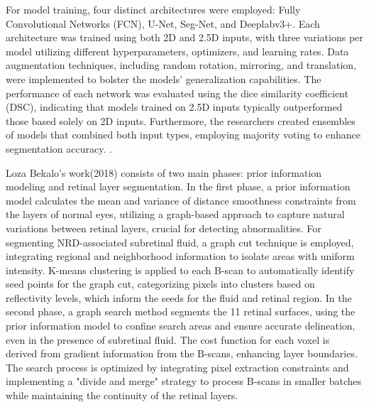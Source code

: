 \documentclass{article}
\begin{document}
For model training, four distinct architectures were employed: Fully Convolutional Networks (FCN), U-Net, Seg-Net, and Deeplabv3+. Each architecture was trained using both 2D and 2.5D inputs, with three variations per model utilizing different hyperparameters, optimizers, and learning rates. Data augmentation techniques, including random rotation, mirroring, and translation, were implemented to bolster the models' generalization capabilities. The performance of each network was evaluated using the dice similarity coefficient (DSC), indicating that models trained on 2.5D inputs typically outperformed those based solely on 2D inputs. Furthermore, the researchers created ensembles of models that combined both input types, employing majority voting to enhance segmentation accuracy. \cite{alsaih2021retinal}.


 Loza Bekalo's work(2018) consists of two main phases: prior information modeling and retinal layer segmentation. In the first phase, a prior information model calculates the mean and variance of distance smoothness constraints from the layers of normal eyes, utilizing a graph-based approach to capture natural variations between retinal layers, crucial for detecting abnormalities. For segmenting NRD-associated subretinal fluid, a graph cut technique is employed, integrating regional and neighborhood information to isolate areas with uniform intensity. K-means clustering is applied to each B-scan to automatically identify seed points for the graph cut, categorizing pixels into clusters based on reflectivity levels, which inform the seeds for the fluid and retinal region. In the second phase, a graph search method segments the 11 retinal surfaces, using the prior information model to confine search areas and ensure accurate delineation, even in the presence of subretinal fluid. The cost function for each voxel is derived from gradient information from the B-scans, enhancing layer boundaries. The search process is optimized by integrating pixel extraction constraints and implementing a "divide and merge" strategy to process B-scans in smaller batches while maintaining the continuity of the retinal layers\cite{bekalo2021automated}.
\end{document}
